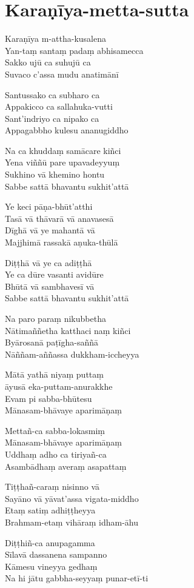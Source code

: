 \chapter{Karaṇīya-metta-sutta}%

\begin{paritta}
Karaṇīya m-attha-kusalena\\
Yan-taṃ santaṃ padaṃ abhisamecca\\
Sakko ujū ca suhujū ca\\
Suvaco c'assa mudu anatimānī

Santussako ca subharo ca\\
Appakicco ca sallahuka-vutti\\
Sant'indriyo ca nipako ca\\
Appagabbho kulesu ananugiddho

Na ca khuddaṃ samācare kiñci\\
Yena viññū pare upavadeyyuṃ\\
Sukhino vā khemino hontu\\
Sabbe sattā bhavantu sukhit'attā

\enlargethispage{\baselineskip}

Ye keci pāṇa-bhūt'atthi\\
Tasā vā thāvarā vā anavasesā\\
Dīghā vā ye mahantā vā\\
Majjhimā rassakā aṇuka-thūlā

Diṭṭhā vā ye ca adiṭṭhā\\
Ye ca dūre vasanti avidūre\\
Bhūtā vā sambhavesī vā\\
Sabbe sattā bhavantu sukhit'attā

Na paro paraṃ nikubbetha\\
Nātimaññetha katthaci naṃ kiñci\\
Byārosanā paṭīgha-saññā\\
Nāññam-aññassa dukkham-iccheyya

Mātā yathā niyaṃ puttaṃ\\
āyusā eka-puttam-anurakkhe\\
Evam pi sabba-bhūtesu\\
Mānasam-bhāvaye aparimāṇaṃ

Mettañ-ca sabba-lokasmiṃ\\
Mānasam-bhāvaye aparimāṇaṃ\\
Uddhaṃ adho ca tiriyañ-ca\\
Asambādhaṃ averaṃ asapattaṃ

Tiṭṭhañ-caraṃ nisinno vā\\
Sayāno vā yāvat'assa vigata-middho\\
Etaṃ satiṃ adhiṭṭheyya\\
Brahmam-etaṃ vihāraṃ idham-āhu

\enlargethispage{\baselineskip}

Diṭṭhiñ-ca anupagamma\\
Sīlavā dassanena sampanno\\
Kāmesu vineyya gedhaṃ\\
Na hi jātu gabbha-seyyaṃ punar-etī-ti

\end{paritta}

